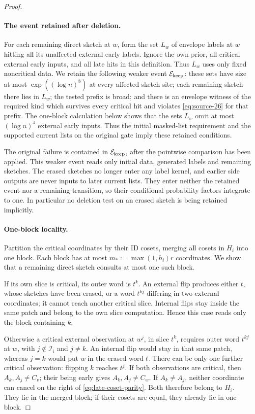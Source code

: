 \begin{proof}
\paragraph{The event retained after deletion.}
For each remaining direct sketch at \(w\), form the set \(L_w\) of
envelope labels at \(w\) hitting all its unaffected external early
labels. Ignore the own prior, all critical external early inputs, and
all late hits in this definition. Thus \(L_w\) uses only fixed
noncritical data. We retain the following weaker event
\(\mathcal E_{\rm keep}\): these sets have size at most
\(\exp((\log n)^8)\) at every affected sketch site; each remaining
sketch there lies in \(L_w\); the tested prefix is broad; and there
is an envelope witness of the required kind which survives every
critical hit and violates \eqref{eq:source-26} for that prefix.
The one-block calculation below shows that the sets \(L_w\) omit at
most \((\log n)^4\) external early inputs. Thus the initial
masked-list requirement and the supported current lists on the
original gate imply these retained conditions.

The original failure is contained in \(\mathcal E_{\rm keep}\),
after the pointwise comparison has been applied. This weaker event
reads only initial data, generated labels and remaining sketches. The
erased sketches no longer enter any label kernel, and earlier side
outputs are never inputs to later current lists. They enter neither
the retained event nor a remaining transition, so their conditional
probability factors integrate to one. In particular no deletion test
on an erased sketch is being retained implicitly.

\paragraph{One-block locality.}
Partition the critical coordinates by their ID cosets, merging all
cosets in \(H_i\) into one block. Each block has at most
\(m_*:=\max(1,h_i)r\) coordinates. We show that a remaining direct
sketch consults at most one such block.

If its own slice is critical, its outer word is \(t^k\). An external
flip produces either \(t\), whose sketches have been erased, or a
word \(t^{kj}\) differing in two external coordinates; it cannot
reach another critical slice. Internal flips stay inside the same
patch and belong to the own slice computation. Hence this case reads
only the block containing \(k\).

Otherwise a critical external observation at \(w^j\), in slice
\(t^k\), requires outer word \(t^{kj}\) at \(w\), with
\(j\notin\mathcal I_i\) and \(j\ne k\). An internal flip would
stay in that same patch, whereas \(j=k\) would put \(w\) in the
erased word \(t\). There can be only one further critical observation:
flipping \(k\) reaches \(t^j\). If both observations are critical,
then \(A_k,A_j\ne C_v\); their being early gives
\(A_k,A_j\ne C_w\). If \(A_k\ne A_j\), neither coordinate can
cancel on the right of \eqref{eq:late-coset-parity}. Both therefore
belong to \(H_i\). They lie in the merged block; if their cosets
are equal, they already lie in one block.


\end{proof}
